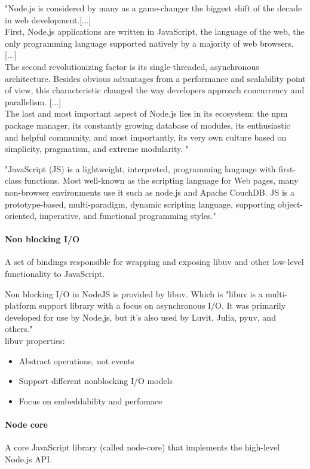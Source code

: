 "Node.js is considered by many as a game-changer the biggest shift of the decade in web development.[...]\\
 First, Node.js applications are written in JavaScript, the language of the web, the only programming language supported natively by a majority of web browsers. [...]\\
The second revolutionizing factor is its single-threaded, asynchronous architecture. 
Besides obvious advantages from a performance and scalability point of view, this characteristic changed the way developers approach concurrency and parallelism. [...]\\
The last and most important aspect of Node.js lies in its ecosystem: the npm package manager, its constantly growing database of modules, its enthusiastic and helpful community, and most importantly, its very own culture based on simplicity, pragmatism, and extreme modularity. "\cite{nodejsbook}

"JavaScript (JS) is a lightweight, interpreted, programming language with first-class functions. Most well-known as the scripting language for Web pages, many non-browser environments use it such as node.js and Apache CouchDB. JS is a prototype-based, multi-paradigm, dynamic scripting language, supporting object-oriented, imperative, and functional programming styles."\cite{mozillaJS}

\paragraph{Non blocking I/O}
A set of bindings responsible for wrapping and exposing libuv and other low-level functionality to JavaScript.\cite{nodejsbook}

Non blocking I/O in NodeJS is provided by libuv\cite{nodejsabout}\cite{nodejsbook}. 
Which is "libuv is a multi-platform support library with a focus on asynchronous I/O. It was primarily developed for use by Node.js, but it’s also used by Luvit, Julia, pyuv, and others."\cite{libuv}\\
libuv properties\cite{libuvBasic}:
\begin{itemize}
\item Abstract operations, not events
\item Support different nonblocking I/O models
\item Focus on embeddability and perfomace
\end{itemize}


\paragraph{Node core}
A core JavaScript library (called node-core) that implements the high-level Node.js API.

